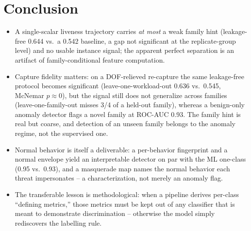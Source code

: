 \documentclass[conference]{IEEEtran}
\begin{document}
\section{Conclusion}
\begin{itemize}
  \item A single-scalar liveness trajectory carries \emph{at most} a weak family
        hint (leakage-free 0.644 vs.\ a 0.542 baseline, a gap not significant at
        the replicate-group level) and no usable instance signal; the apparent
        perfect separation is an artifact of family-conditional feature
        computation.
  \item Capture fidelity matters: on a DOF-relieved re-capture the same
        leakage-free protocol becomes significant (leave-one-workload-out 0.636
        vs.\ 0.545, McNemar $p\approx0$), but the signal still does not generalize
        across families (leave-one-family-out misses 3/4 of a held-out family),
        whereas a benign-only anomaly detector flags a novel family at ROC-AUC
        0.93. The family hint is real but coarse, and detection of an unseen
        family belongs to the anomaly regime, not the supervised one.
  \item Normal behavior is itself a deliverable: a per-behavior fingerprint and a
        normal envelope yield an interpretable detector on par with the ML
        one-class (0.95 vs.\ 0.93), and a masquerade map names the normal behavior
        each threat impersonates -- a characterization, not merely an anomaly flag.
  \item The transferable lesson is methodological: when a pipeline derives
        per-class ``defining metrics,'' those metrics must be kept out of any
        classifier that is meant to demonstrate discrimination -- otherwise the
        model simply rediscovers the labelling rule.
\end{itemize}



\end{document}

